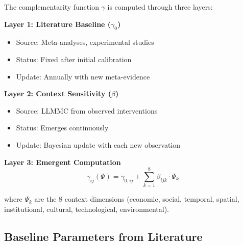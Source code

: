 \begin{tcolorbox}[colback=blue!5!white, colframe=blue!75!black,
    title=\textbf{Definition EIT-EMP-1-D1: Three-Layer Gamma Architecture}]

The complementarity function $\gamma$ is computed through three layers:

\textbf{Layer 1: Literature Baseline ($\gamma_0$)}
\begin{itemize}[nosep]
    \item Source: Meta-analyses, experimental studies
    \item Status: Fixed after initial calibration
    \item Update: Annually with new meta-evidence
\end{itemize}

\textbf{Layer 2: Context Sensitivity ($\beta$)}
\begin{itemize}[nosep]
    \item Source: LLMMC from observed interventions
    \item Status: Emerges continuously
    \item Update: Bayesian update with each new observation
\end{itemize}

\textbf{Layer 3: Emergent Computation}
\begin{equation}
\boxed{\gamma_{ij}(\Psi) = \gamma_{0,ij} + \sum_{k=1}^{8} \beta_{ijk} \cdot \Psi_k}
\label{eq:gamma-emergence}
\end{equation}

where $\Psi_k$ are the 8 context dimensions (economic, social, temporal, spatial, institutional, cultural, technological, environmental).

\end{tcolorbox}

\subsection{Baseline Parameters from Literature}
\label{subsec:emp1-baseline}

